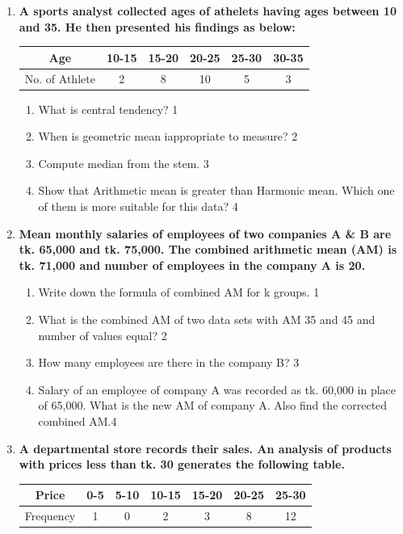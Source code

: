 \documentclass[a4paper,oneside]{book}
\begin{document}
\begin{enumerate}
     \item
	  \textbf{A sports analyst collected ages of athelets having ages between 10 and 35. He then presented his findings as below:} 
	  
	  \begin{table}[h]
	    \centering
\begin{tabular}{c|c|c|c|c|c}
Age            & 10-15 & 15-20 & 20-25 & 25-30 & 30-35 \\ \hline
No. of Athlete & 2     & 8     & 10    & 5     & 3    
\end{tabular}
\end{table}
  
  \begin{enumerate}
    \item
	What is central tendency? \hfill 1
    \item
	When is geometric mean iappropriate to measure? \hfill 2
    \item  
	Compute median from the stem. \hfill 3
    \item
	Show that Arithmetic mean is greater than Harmonic mean. Which one of them is more suitable for this data? \hfill 4
  \end{enumerate}

   \item
	  \textbf{Mean monthly salaries of employees of two companies A \& B are tk. 65,000 and tk. 75,000. The combined arithmetic mean (AM) is tk. 71,000 and number of employees in the company A is 20.} 
	  
  \begin{enumerate}
    \item
	Write down the formula of combined AM for k groups. \hfill 1
    \item
	What is the combined AM of two data sets with AM 35 and 45 and number of values equal? \hfill 2
    \item  
	How many employees are there in the company B? \hfill 3
    \item
	Salary of an employee of company A was recorded as tk. 60,000 in place of 65,000. What is the new AM of company A. Also find the corrected combined AM.\hfill 4
  \end{enumerate}

     \item
	  \textbf{A departmental store records their sales. An analysis of products with prices less than tk. 30 generates the following table.} 
	  
\begin{table}[h]
\centering
\begin{tabular}{ccccccc}
Price     & 0-5 & 5-10 & 10-15 & 15-20 & 20-25 & 25-30 \\ \hline
Frequency & 1   & 0    & 2     & 3     & 8     & 12   
\end{tabular}
\end{table}
  

\end{enumerate}
\end{document}
